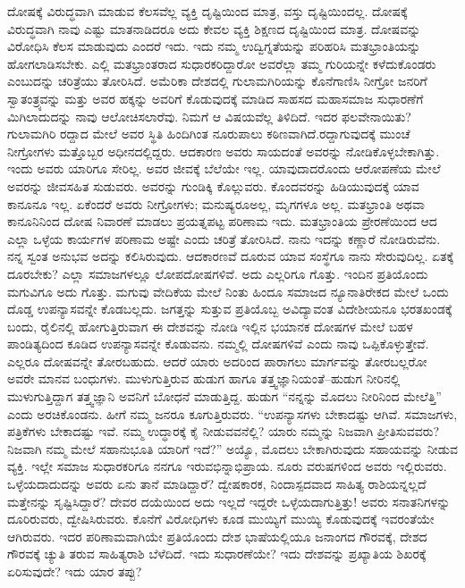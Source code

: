 ದೋಷಕ್ಕೆ ವಿರುದ್ಧವಾಗಿ ಮಾಡುವ ಕೆಲಸವೆಲ್ಲ ವ್ಯಕ್ತಿ ದೃಷ್ಟಿಯಿಂದ ಮಾತ್ರ, ವಸ್ತು ದೃಷ್ಟಿಯಿಂದಲ್ಲ. ದೋಷಕ್ಕೆ ವಿರುದ್ಧವಾಗಿ ನಾವು ಎಷ್ಟು ಮಾತನಾಡಿದರೂ ಅದು ಕೇವಲ ವ್ಯಕ್ತಿ ಶಿಕ್ಷಣದ ದೃಷ್ಟಿಯಿಂದ ಮಾತ್ರ. ದೋಷವನ್ನು ವಿರೋಧಿಸಿ ಕೆಲಸ ಮಾಡುವುದು ಎಂದರೆ ಇದು. ಇದು ನಮ್ಮ ಉದ್ವಿಗ್ನತೆಯನ್ನು ಪರಿಹರಿಸಿ ಮತಭ್ರಾಂತಿಯನ್ನು ಹೋಗಲಾಡಿಸಬೇಕು. ಎಲ್ಲಿ ಮತಭ್ರಾಂತರಾದ ಸುಧಾರಕರಿದ್ದಾರೋ ಅವರೆಲ್ಲಾ ತಮ್ಮ ಗುರಿಯನ್ನೇ ಕಳೆದು\-ಕೊಂಡರು ಎಂಬುದನ್ನು ಚರಿತ್ರೆಯು ತೋರಿಸಿದೆ. ಅಮೆರಿಕಾ ದೇಶದಲ್ಲಿ ಗುಲಾಮಗಿರಿಯನ್ನು ಕೊನೆಗಾಣಿಸಿ ನೀಗ್ರೋ ಜನರಿಗೆ ಸ್ವಾತಂತ್ರ್ಯವನ್ನು ಮತ್ತು ಅವರ ಹಕ್ಕನ್ನು ಅವರಿಗೆ ಕೊಡುವುದಕ್ಕೆ ಮಾಡಿದ ಸಾಹಸದ ಮಹಾಸಮಾಜ ಸುಧಾರಣೆಗೆ ಮಿಗಿಲಾದುದನ್ನು ನಾವು ಆಲೋಚಿಸಲಾರೆವು. ನಿಮಗೆ ಆ ವಿಷಯವೆಲ್ಲ ತಿಳಿದಿದೆ. ಇದರ ಫಲವೇನಾಯಿತು? ಗುಲಾಮಗಿರಿ ರದ್ದಾದ ಮೇಲೆ ಅವರ ಸ್ಥಿತಿ ಹಿಂದಿಗಿಂತ ನೂರುಪಾಲು ಕಠಿಣವಾಗಿದೆ.\break ರದ್ದಾಗುವುದಕ್ಕೆ ಮುಂಚೆ ನೀಗ್ರೋಗಳು ಮತ್ತೊಬ್ಬರ ಅಧೀನದಲ್ಲಿದ್ದರು. ಆದಕಾರಣ ಅವರು ಸಾಯದಂತೆ ಅವರನ್ನು ನೋಡಿಕೊಳ್ಳಬೇಕಾಗಿತ್ತು. ಇಂದು ಅವರು ಯಾರಿಗೂ ಸೇರಿಲ್ಲ. ಅವರ ಜೀವಕ್ಕೆ ಬೆಲೆಯೇ ಇಲ್ಲ. ಯಾವುದಾದರೊಂದು ಆರೋಪಣೆಯ ಮೇಲೆ ಅವರನ್ನು ಜೀವಸಹಿತ ಸುಡುವರು. ಅವರನ್ನು ಗುಂಡಿಕ್ಕಿ ಕೊಲ್ಲುವರು. ಕೊಂದವರನ್ನು ಹಿಡಿಯು\-ವುದಕ್ಕೆ ಯಾವ ಕಾನೂನೂ ಇಲ್ಲ. ಏಕೆಂದರೆ ಅವರು ನೀಗ್ರೋಗಳು; ಮನುಷ್ಯರೂ\break ಅಲ್ಲ, ಮೃಗಗಳೂ ಅಲ್ಲ. ಮತಭ್ರಾಂತಿ ಅಥವಾ ಕಾನೂನಿನಿಂದ ದೋಷ ನಿವಾರಣೆ ಮಾಡಲು ಪ್ರಯತ್ನಪಟ್ಟ ಪರಿಣಾಮ ಇದು. ಮತಭ್ರಾಂತಿಯ ಪ್ರೇರಣೆಯಿಂದ ಆದ ಎಲ್ಲಾ ಒಳ್ಳೆಯ ಕಾರ್ಯಗಳ ಪರಿಣಾಮ ಅಷ್ಟೇ ಎಂದು ಚರಿತ್ರೆ ತೋರಿಸಿದೆ. ನಾನು ಇದನ್ನು ಕಣ್ಣಾರೆ ನೋಡಿರುವೆನು. ನನ್ನ ಸ್ವಂತ ಅನುಭವ ಅದನ್ನು ಕಲಿಸಿರುವುದು. ಆದಕಾರಣವೆ ದೂರುವ ಯಾವ ಸಂಸ್ಥೆಗೂ ನಾನು ಸೇರುವುದಿಲ್ಲ. ಏತಕ್ಕೆ ದೂರಬೇಕು? ಎಲ್ಲಾ ಸಮಾಜಗಳಲ್ಲೂ ಲೋಪದೋಷಗಳಿವೆ. ಅದು ಎಲ್ಲರಿಗೂ ಗೊತ್ತು. ಇಂದಿನ ಪ್ರತಿಯೊಂದು ಮಗುವಿಗೂ ಅದು ಗೊತ್ತು. ಮಗುವು ವೇದಿಕೆಯ ಮೇಲೆ ನಿಂತು ಹಿಂದೂ ಸಮಾಜದ ನ್ಯೂನಾತಿರೇಕದ ಮೇಲೆ ಒಂದು ದೊಡ್ಡ ಉಪನ್ಯಾಸವನ್ನೇ ಕೊಡಬಲ್ಲದು. ಜಗತ್ತನ್ನು ಸುತ್ತುವ ಪ್ರತಿಯೊಬ್ಬ ಅವಿದ್ಯಾವಂತ ವಿದೇಶೀಯನೂ ಭರತಖಂಡಕ್ಕೆ ಬಂದು, ರೈಲಿನಲ್ಲಿ ಹೋಗುತ್ತಿರುವಾಗ ಈ ದೇಶವನ್ನು ನೋಡಿ ಇಲ್ಲಿನ ಭಯಾನಕ ದೋಷಗಳ ಮೇಲೆ ಬಹಳ ಪಾಂಡಿತ್ಯದಿಂದ ಕೂಡಿದ ಉಪನ್ಯಾಸವನ್ನೇ ಕೊಡುವನು. ನಮ್ಮಲ್ಲಿ ದೋಷಗಳಿವೆ ಎಂದು ನಾವು ಒಪ್ಪಿಕೊಳ್ಳುತ್ತೇವೆ. ಎಲ್ಲರೂ ದೋಷವನ್ನೇ ತೋರಬಹುದು. ಆದರೆ ಯಾರು ಅದರಿಂದ ಪಾರಾಗಲು ಮಾರ್ಗವನ್ನು ತೋರಬಲ್ಲರೋ ಅವರೇ ಮಾನವ ಬಂಧುಗಳು. ಮುಳುಗುತ್ತಿರುವ ಹುಡುಗ ಹಾಗೂ ತತ್ತ್ವಜ್ಞಾನಿಯಂತೆ–ಹುಡುಗ ನೀರಿನಲ್ಲಿ ಮುಳುಗುತ್ತಿದ್ದಾಗ ತತ್ತ್ವಜ್ಞಾನಿ ಅವನಿಗೆ ಬೋಧನೆ ಮಾಡುತ್ತಿದ್ದ. ಹುಡುಗ “ನನ್ನನ್ನು ಮೊದಲು ನೀರಿನಿಂದ ಮೇಲೆತ್ತಿ” ಎಂದು ಅರಚಿಕೊಂಡನು. ಹೀಗೆ ನಮ್ಮ ಜನರೂ ಕೂಗುತ್ತಿರುವರು. “ಉಪನ್ಯಾಸಗಳು ಬೇಕಾದಷ್ಟು ಆಗಿವೆ. ಸಮಾಜಗಳು, ಪತ್ರಿಕೆಗಳು ಬೇಕಾದಷ್ಟು ಇವೆ. ನಮ್ಮ ಉದ್ಧಾರಕ್ಕೆ ಕೈ ನೀಡುವವನೆಲ್ಲಿ? ಯಾರು ನಮ್ಮನ್ನು ನಿಜವಾಗಿ ಪ್ರೀತಿಸುವವರು? ನಿಜವಾಗಿ ನಮ್ಮ ಮೇಲೆ ಸಹಾನುಭೂತಿ ಯಾರಿಗೆ ಇದೆ?” ಅಯ್ಯೊ, ಮೊದಲು ಬೇಕಾಗಿರುವುದು ಸಹಾಯವನ್ನು ನೀಡುವ ವ್ಯಕ್ತಿ. ಇಲ್ಲೇ ಸಮಾಜ ಸುಧಾರಕರಿಗೂ ನನಗೂ ಇರುವ\break ಭಿನ್ನಾಭಿಪ್ರಾಯ. ನೂರು ವರುಷಗಳಿಂದ ಅವರು ಇಲ್ಲಿರುವರು. ಒಳ್ಳೆಯದಾದುದನ್ನು ಅವರು ಏನು ತಾನೆ ಮಾಡಿದ್ದಾರೆ? ದ್ವೇಷಕಾರಕ, ನಿಂದಾಸ್ಪದವಾದ ಸಾಹಿತ್ಯ ರಾಶಿಯನ್ನಲ್ಲದೆ ಮತ್ತೇನನ್ನು ಸೃಷ್ಟಿಸಿದ್ದಾರೆ? ದೇವರ ದಯೆಯಿಂದ ಅದು ಇಲ್ಲದೆ ಇದ್ದರೇ ಒಳ್ಳೆಯದಾಗುತ್ತಿತ್ತು! ಅವರು ಸನಾತನಿಗಳನ್ನು ದೂರಿರುವರು, ದ್ವೇಷಿಸಿರುವರು. ಕೊನೆಗೆ ವಿರೋಧಿ\-ಗಳು ಕೂಡ ಮುಯ್ಯಿಗೆ ಮುಯ್ಯಿ ಕೊಡುವುದಕ್ಕೆ ಇವರಂತೆಯೇ ಆಗಿರುವರು. ಇದರ ಪರಿಣಾಮವಾಗಿಯೇ ಪ್ರತಿಯೊಂದು ದೇಶ ಭಾಷೆಯಲ್ಲಿಯೂ ಜನಾಂಗದ ಗೌರವಕ್ಕೆ, ದೇಶದ ಗೌರವಕ್ಕೆ ಚ್ಯುತಿ ತರುವ ಸಾಹಿತ್ಯರಾಶಿ ಬೆಳೆದಿದೆ. ಇದು ಸುಧಾರಣೆಯೇ? ಇದು ದೇಶವನ್ನು ಪ್ರಖ್ಯಾತಿಯ ಶಿಖರಕ್ಕೆ ಏರಿಸುವುದೇ? ಇದು ಯಾರ ತಪ್ಪು?

